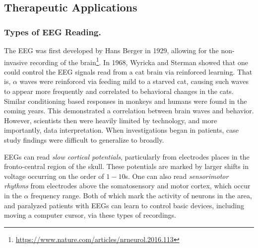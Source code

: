 \subsection{Therapeutic Applications}

\subsubsection{Types of EEG Reading.}

The EEG was first developed by Hans Berger in 1929, allowing for the non-invasive recording of the brain\footnote{\url{https://www.nature.com/articles/nrneurol.2016.113}}. In 1968, Wyricka and Sterman showed that one could control the EEG signals read from a cat brain via reinforced learning. That is, $\alpha$ waves were reinforced via feeding mild to a starved cat, causing such waves to appear more frequently and correlated to behavioral changes in the cats. Similar conditioning based responses in monkeys and humans were found in the coming years. This demonstrated a correlation between brain waves and behavior. However, scientists then were heavily limited by technology, and more importantly, data interpretation. When investigations began in patients, case study findings were difficult to generalize to broadly. \newline

EEGs can read \textit{slow cortical potentials}, particularly from electrodes places in the fronto-central region of the skull. These potentials are marked by larger shifts in voltage occurring on the order of $1-10$s. One can also read \textit{sensorimotor rhythms} from electrodes above the somatosensory and motor cortex, which occur in the $\alpha$ frequency range. Both of which mark the activity of neurons in the area, and paralyzed patients with EEGs can learn to control basic devices, including moving a computer cursor, via these types of recordings. \newline

